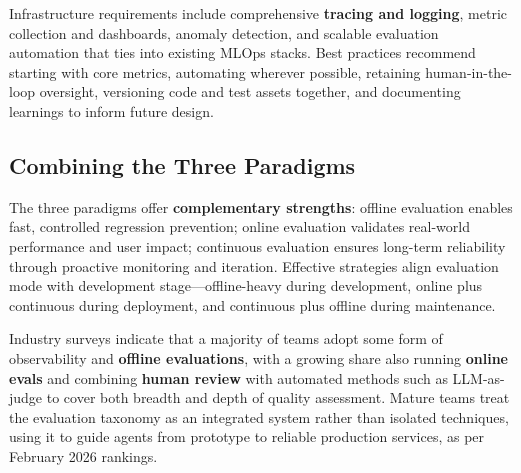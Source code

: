 \begin{TNtwocol}
Infrastructure requirements include comprehensive \textbf{tracing and logging}, metric collection and dashboards, anomaly detection, and scalable evaluation automation that ties into existing MLOps stacks. Best practices recommend starting with core metrics, automating wherever possible, retaining human-in-the-loop oversight, versioning code and test assets together, and documenting learnings to inform future design.

\subsection*{Combining the Three Paradigms}

The three paradigms offer \textbf{complementary strengths}: offline evaluation enables fast, controlled regression prevention; online evaluation validates real-world performance and user impact; continuous evaluation ensures long-term reliability through proactive monitoring and iteration. Effective strategies align evaluation mode with development stage—offline-heavy during development, online plus continuous during deployment, and continuous plus offline during maintenance.

Industry surveys indicate that a majority of teams adopt some form of observability and \textbf{offline evaluations}, with a growing share also running \textbf{online evals} and combining \textbf{human review} with automated methods such as LLM-as-judge to cover both breadth and depth of quality assessment. Mature teams treat the evaluation taxonomy as an integrated system rather than isolated techniques, using it to guide agents from prototype to reliable production services, as per February 2026 rankings.
​

\end{TNtwocol}
